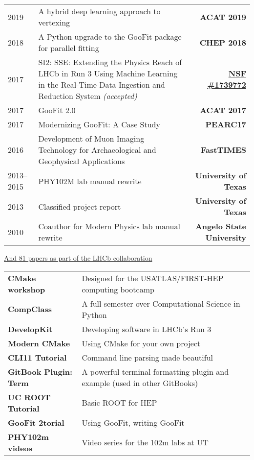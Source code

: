 \documentclass[10pt,letterpaper,english]{moderncv}
\begin{document}
\begin{tabularx}{\textwidth}{p{.8in}X>{\bfseries}r}


2019 & A hybrid deep learning approach to vertexing &  ACAT 2019 \\ 
2018 & A Python upgrade to the GooFit package for parallel fitting & CHEP 2018 \\
2017 & SI2: SSE: Extending the Physics Reach of LHCb in Run 3 Using Machine Learning in the Real-Time Data Ingestion and Reduction System  \textit{(accepted)} & \href{https://nsf.gov/awardsearch/showAward?AWD_ID=1739772}{NSF \#1739772} \\ %
2017 & GooFit 2.0 & ACAT 2017 \\ %
2017 & Modernizing GooFit: A Case Study & PEARC17 \\ 
2016 & Development of Muon Imaging Technology
for Archaeological and Geophysical Applications & FastTIMES \\
2013--2015 & PHY102M lab manual rewrite & University of Texas \\
2013 & Classified project report & University of Texas\\
2010 & Coauthor for Modern Physics lab manual rewrite & Angelo State University\\
\end{tabularx}
\href{http://inspirehep.net/search?ln=en&p=find+jy+2017+or+jy+2018+and+author+schreiner+and+author+sokoloff&of=hb&action_search=Search&sf=earliestdate&so=d}
{And 81 papers as part of the LHCb collaboration}


\begin{tabularx}{\textwidth}{>{\bfseries}p{1.45in}X}
CMake workshop & Designed for the USATLAS/FIRST-HEP computing bootcamp \\
CompClass & A full semester over Computational Science in Python \\
DevelopKit & Developing software in LHCb’s Run 3 \\
Modern CMake & Using CMake for your own project \\
CLI11 Tutorial & Command line parsing made beautiful \\
GitBook Plugin: Term & A powerful terminal formatting plugin and example (used in other GitBooks) \\
UC ROOT Tutorial & Basic ROOT for HEP \\
GooFit 2torial & Using GooFit, writing GooFit \\
PHY102m videos & Video series for the 102m labs at UT \\
\end{tabularx}
\end{document}
